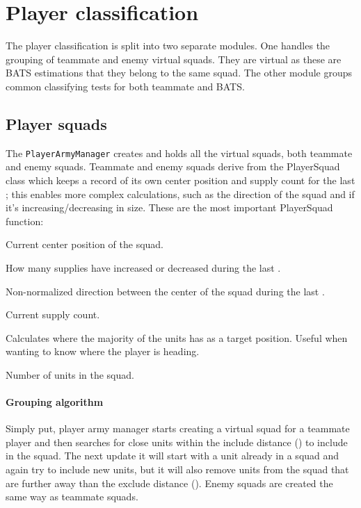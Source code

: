 \section{Player classification}
The player classification is split into two separate modules. One handles the grouping of teammate
and enemy virtual squads. They are virtual as these are BATS estimations that they belong to the
same squad. The other module groups common classifying tests for both teammate and BATS. 

\subsection{Player squads}
The \texttt{PlayerArmyManager} creates and holds all the virtual squads, both teammate and enemy
squads. Teammate and enemy squads derive from the PlayerSquad class which keeps a record of its own
center position and supply count for the last \classificationMeasureTimeTotal; this enables more
complex calculations, such as the direction of the squad and if it's increasing/decreasing in size.
These are the most important PlayerSquad function:
\begin{function_description}
	\item[\texttt{TilePosition getCenter()}] Current center position of the squad.
	\item[\texttt{int getDeltaSupplyCount()}] How many supplies have increased or decreased during the
		last \classificationMeasureTimeTotal.
	\item[\texttt{TilePosition getDirection()}] Non-normalized direction between the center of the
		squad during the last \classificationMeasureTimeTotal.
	\item[\texttt{int getSupplyCount()}] Current supply count.
	\item[\texttt{TilePosition getTargetPosition()}] Calculates where the majority of the units has as
		a target position. Useful when wanting to know where the player is heading.
	\item[\texttt{int getUnitCount()}] Number of units in the squad.	
\end{function_description}

\paragraph{Grouping algorithm}
Simply put, player army manager starts creating a virtual squad for a teammate player and then
searches for close units within the include distance (\classificationSquadIncludeDistance) to
include in the squad. The next update it will start with a unit already in a squad and again try to
include new units, but it will also remove units from the squad that are further away than the
exclude distance (\classificationSquadExcludeDistance). Enemy squads are created the same way as
teammate squads.

